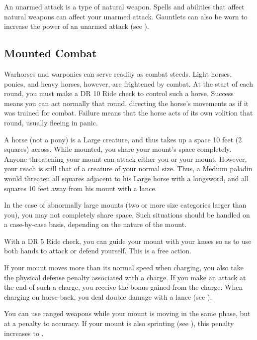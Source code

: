         An unarmed attack is a type of natural weapon.
        Spells and abilities that affect natural weapons can affect your unarmed attack.
        Gauntlets can also be worn to increase the power of an unarmed attack (see ).

    \subsection{Mounted Combat}\label{Mounted Combat}
         Warhorses and warponies can serve readily as combat steeds. Light horses, ponies, and heavy horses, however, are frightened by combat.
        At the start of each round, you must make a DR 10 Ride check to control such a horse.
        Success means you can act normally that round, directing the horse's movements as if it was trained for combat.
        Failure means that the horse acts of its own volition that round, usually fleeing in panic.

         A horse (not a pony) is a Large creature, and thus takes up a space 10 feet (2 squares) across. While mounted, you share your mount's space completely. Anyone threatening your mount can attack either you or your mount. However, your reach is still that of a creature of your normal size. Thus, a Medium paladin would threaten all squares adjacent to his Large horse with a longsword, and all squares 10 feet away from his mount with a lance.

        In the case of abnormally large mounts (two or more size categories larger than you), you may not completely share space. Such situations should be handled on a case-by-case basis, depending on the nature of the mount.

         With a DR 5 Ride check, you can guide your mount with your knees so as to use both hands to attack or defend yourself. This is a free action.

        If your mount moves more than its normal speed when charging, you also take the physical defense penalty associated with a charge. If you make an attack at the end of such a charge, you receive the bonus gained from the charge. When charging on horse-back, you deal double damage with a lance (see ).

        You can use ranged weapons while your mount is moving in the same phase, but at a  penalty to accuracy.
        If your mount is also sprinting (see ), this penalty increases to .

